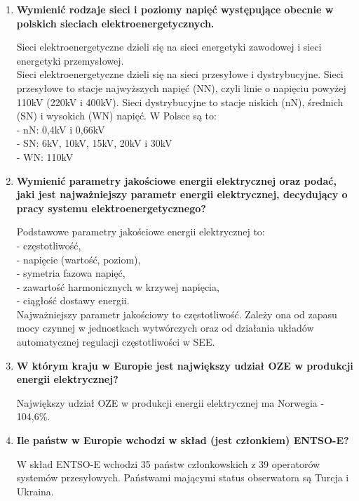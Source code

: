 \documentclass[12pt]{article}
\begin{document}
\begin{enumerate}
    \item \textbf{Wymienić rodzaje sieci i poziomy napięć występujące obecnie w polskich sieciach elektroenergetycznych.}

        Sieci elektroenergetyczne dzieli się na sieci energetyki zawodowej i sieci
        energetyki przemysłowej.\\ Sieci elektroenergetyczne dzieli się na sieci przesyłowe i dystrybucyjne. 
        Sieci przesyłowe to stacje najwyższych napięć (NN), czyli linie o napięciu powyżej 110kV (220kV i 400kV).
        Sieci dystrybucyjne to stacje niskich (nN), średnich (SN) i wysokich (WN) napięć. 
        W Polsce są to:\\
        - nN: 0,4kV i 0,66kV\\
        - SN: 6kV, 10kV, 15kV, 20kV i 30kV\\
        - WN: 110kV
    
    \item \textbf{Wymienić parametry jakościowe energii elektrycznej oraz podać, jaki jest najważniejszy parametr 
    energii elektrycznej, decydujący o pracy systemu elektroenergetycznego?}

        Podstawowe parametry jakościowe energii elektrycznej to:\\
        - częstotliwość,\\
        - napięcie (wartość, poziom),\\
        - symetria fazowa napięć,\\
        - zawartość harmonicznych w krzywej napięcia,\\
        - ciągłość dostawy energii.\\
        Najważniejszy parametr jakościowy to częstotliwość. Zależy ona od zapasu mocy czynnej w jednostkach
        wytwórczych oraz od działania układów automatycznej regulacji częstotliwości w SEE.

    \item \textbf{W którym kraju w Europie jest największy udział OZE w produkcji energii elektrycznej?}

        Największy udział OZE w produkcji energii elektrycznej ma Norwegia - 104,6\%.
        
    \item \textbf{Ile państw w Europie wchodzi w skład (jest członkiem) ENTSO-E?}

        W skład ENTSO-E wchodzi 35 państw członkowskich z 39 operatorów systemów przesyłowych. Państwami mającymi status obserwatora są Turcja i Ukraina.
        

\end{enumerate}
\end{document}
